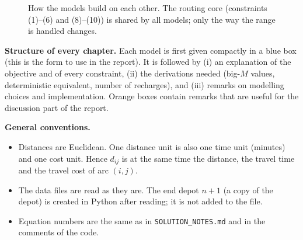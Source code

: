 \documentclass[11pt,a4paper]{article}
\theoremstyle{definition}
\begin{document}
\begin{figure}[H]
\centering
{}
\caption{How the models build on each other. The routing core (constraints (1)--(6) and (8)--(10)) is shared by all models; only the way the range is handled changes.}
\label{fig:hierarchy}
\end{figure}

\textbf{Structure of every chapter.} Each model is first given compactly in a blue box (this is the form to use in the report). It is followed by (i) an explanation of the objective and of every constraint, (ii) the derivations needed (big-$M$ values, deterministic equivalent, number of recharges), and (iii) remarks on modelling choices and implementation. Orange boxes contain remarks that are useful for the discussion part of the report.

\textbf{General conventions.}
\begin{itemize}
\item Distances are Euclidean. One distance unit is also one time unit (minutes) and one cost unit. Hence $d_{ij}$ is at the same time the distance, the travel time and the travel cost of arc $(i,j)$.
\item The data files are read as they are. The end depot $n+1$ (a copy of the depot) is created in Python after reading; it is not added to the file.
\item Equation numbers are the same as in \texttt{SOLUTION\_NOTES.md} and in the comments of the code.
\end{itemize}
\end{document}
